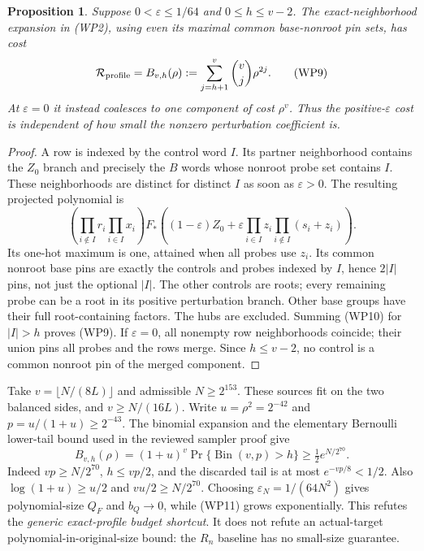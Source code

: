 \documentclass[11pt]{article}
\newtheorem{proposition}{Proposition}
\begin{document}
\begin{proposition}
Suppose $0<\varepsilon\le1/64$ and $0\le h\le v-2$.
The exact-neighborhood expansion in (WP2), using even its
\emph{maximal} common base-nonroot pin sets, has cost
\[
 {\cal R}_{\rm profile}
       = B_{v,h}(\rho):=\sum_{j=h+1}^v\binom vj\rho^{2j}.          \tag{WP9}
\]
At $\varepsilon=0$ it instead coalesces to one component of cost
$\rho^v$. Thus the positive-$\varepsilon$ cost is independent of
how small the nonzero perturbation coefficient is.
\end{proposition}
\begin{proof}
A row is indexed by the control word $I$. Its partner neighborhood
contains the $Z_0$ branch and precisely the $B$ words whose nonroot
probe set contains $I$. These neighborhoods are distinct for distinct
$I$ as soon as $\varepsilon>0$.
The resulting projected polynomial is
\[
 \left(\prod_{i\notin I}r_i\prod_{i\in I}x_i\right)F_*
 \left((1-\varepsilon)Z_0+
        \varepsilon\prod_{i\in I}z_i
                    \prod_{i\notin I}(s_i+z_i)\right).            \tag{WP10}
\]
Its one-hot maximum is one, attained when all probes use $z_i$.
Its common nonroot base pins are exactly the controls and probes
indexed by $I$, hence $2|I|$ pins, not just the optional $|I|$.
The other controls are roots; every remaining probe can be a root
in its positive perturbation branch. Other base groups have their
full root-containing factors. The hubs are excluded.
Summing (WP10) for $|I|>h$ proves (WP9).
If $\varepsilon=0$, all nonempty row neighborhoods coincide;
their union pins all probes and the rows merge. Since $h\le v-2$,
no control is a common nonroot pin of the merged component.
\end{proof}

Take $v=\lfloor N/(8L)\rfloor$ and admissible $N\ge2^{153}$.
These sources fit on the two balanced sides, and $v\ge N/(16L)$.
Write $u=\rho^2=2^{-42}$ and $p=u/(1+u)\ge2^{-43}$.
The binomial expansion and the elementary Bernoulli lower-tail
bound used in the reviewed sampler proof give
\[
 B_{v,h}(\rho)
   =(1+u)^v\Pr\{\operatorname{Bin}(v,p)>h\}
   \ge\tfrac12 e^{N/2^{70}}.                           \tag{WP11}
\]
Indeed $vp\ge N/2^{70}$, $h\le vp/2$, and the discarded tail is
at most $e^{-vp/8}<1/2$.
Also $\log(1+u)\ge u/2$ and $v u/2\ge N/2^{70}$.
Choosing $\varepsilon_N=1/(64N^2)$ gives polynomial-size $Q_F$
and $b_Q\to0$, while (WP11) grows exponentially.
This refutes the \emph{generic exact-profile budget shortcut}.
It does not refute an actual-target polynomial-in-original-size
bound: the $R_n$ baseline has no small-size guarantee.
\end{document}
